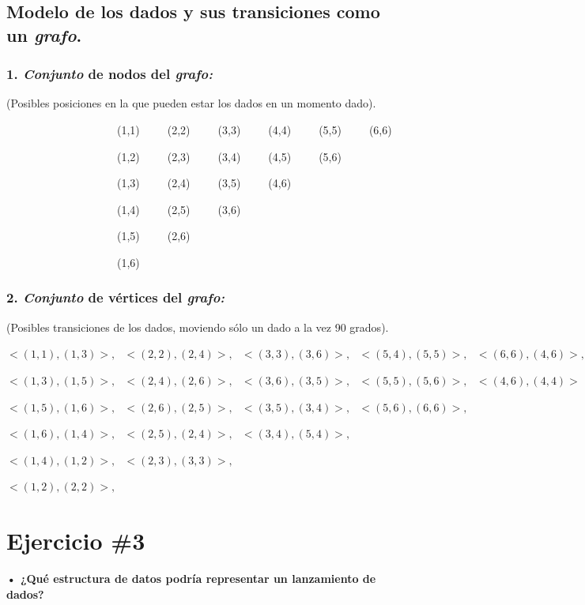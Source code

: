 \documentclass[11pt,letterpaper]{article}
\begin{document}
\subsection*{\textbf{\Large Modelo de los dados y sus transiciones como un \emph{grafo}.}}
\subsubsection*{\textbf{1. \emph{Conjunto} de nodos del \emph{grafo:}}}

(Posibles posiciones en la que pueden estar los dados en un momento dado).
\bigskip

\ \ \ \ \ \ \ \ \ \ \ \ \ \ \ \ \ \ \ \ (1,1)\ \ \ \ \ (2,2)\ \ \ \ \ (3,3)\ \ \ \ \ (4,4)\ \ \ \ \ (5,5)\ \ \ \ \ (6,6)

\ \ \ \ \ \ \ \ \ \ \ \ \ \ \ \ \ \ \ \ (1,2)\ \ \ \ \ (2,3)\ \ \ \ \ (3,4)\ \ \ \ \ (4,5)\ \ \ \ \ (5,6)

\ \ \ \ \ \ \ \ \ \ \ \ \ \ \ \ \ \ \ \ (1,3)\ \ \ \ \ (2,4)\ \ \ \ \ (3,5)\ \ \ \ \ (4,6)

\ \ \ \ \ \ \ \ \ \ \ \ \ \ \ \ \ \ \ \ (1,4)\ \ \ \ \ (2,5)\ \ \ \ \ (3,6)

\ \ \ \ \ \ \ \ \ \ \ \ \ \ \ \ \ \ \ \ (1,5)\ \ \ \ \ (2,6)

\ \ \ \ \ \ \ \ \ \ \ \ \ \ \ \ \ \ \ \ (1,6)

\subsubsection*{\textbf{2. \emph{Conjunto} de vértices del \emph{grafo:}}}

(Posibles transiciones de los dados, moviendo sólo un dado a la vez 90 grados).
\bigskip

\noindent$<(1,1),(1,3)>,\ \ \ <(2,2),(2,4)>,\ \ \ <(3,3),(3,6)>,\ \ \ <(5,4),(5,5)>,\ \ \ <(6,6),(4,6)>,$

\noindent$<(1,3),(1,5)>,\ \ \ <(2,4),(2,6)>,\ \ \ <(3,6),(3,5)>,\ \ \ <(5,5),(5,6)>,\ \ \ <(4,6),(4,4)>$

\noindent$<(1,5),(1,6)>,\ \ \ <(2,6),(2,5)>,\ \ \ <(3,5),(3,4)>,\ \ \ <(5,6),(6,6)>,$

\noindent$<(1,6),(1,4)>,\ \ \ <(2,5),(2,4)>,\ \ \ <(3,4),(5,4)>,$

\noindent$<(1,4),(1,2)>,\ \ \ <(2,3),(3,3)>,$

\noindent$<(1,2),(2,2)>,$
\vspace{0.05cm}

\section*{\textbf{Ejercicio \#3}}
\textbf{• ¿Qué estructura de datos podría representar un lanzamiento de dados?}
\end{document}
